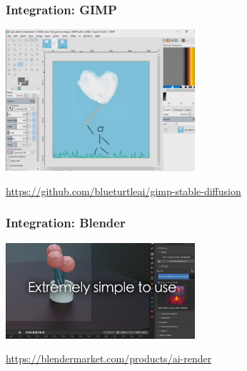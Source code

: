 \documentclass[17pt,aspectratio=169,hyperref={pdfusetitle,colorlinks,allcolors=olive}]{beamer}
\begin{document}
\begin{frame}[fragile]
  \frametitle{Integration: GIMP}

    \begin{center}
    \includegraphics[width=7cm]{figs/sd-gimp}
  \end{center}

  \begin{flushright}
    {\scriptsize
    \url{https://github.com/blueturtleai/gimp-stable-diffusion} \\
    }
  \end{flushright}
  
\end{frame}

\begin{frame}[fragile]
  \frametitle{Integration: Blender}

    \begin{center}
    \includegraphics[width=7cm]{figs/sd-blender}
  \end{center}

  \begin{flushright}
    {\scriptsize
    \url{https://blendermarket.com/products/ai-render} \\
    }
  \end{flushright}
  
\end{frame}
\end{document}

